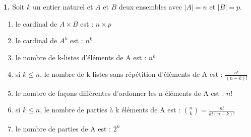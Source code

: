 \documentclass[11pt,a4paper]{article}
\begin{document}
\noindent \textbf{1.} Soit $k$ un entier naturel et $A$ et $B$ deux ensembles avec $|A|=n$ et $|B|=p$.
\begin{enumerate}
    \item[(a)] le cardinal de $A \times B$ est : $n \times p$
    
    \item[(b)] le cardinal de $A^k$ est : $n^k$
    
    \item[(c)] le nombre de k-listes d'éléments de A est : $n^k$
    
    \item[(d)] si $k \le n$, le nombre de k-listes sans répétition d'éléments de A est : $\frac{n!}{(n-k)!}$
    
    \item[(e)] le nombre de façons différentes d'ordonner les n éléments de A est : $n!$
    
    \item[(f)] si $k \le n$, le nombre de parties à k éléments de A est : $\binom{n}{k} = \frac{n!}{k!(n-k)!}$
    
    \item[(g)] le nombre de parties de A est : $2^n$
\end{enumerate}
\end{document}
